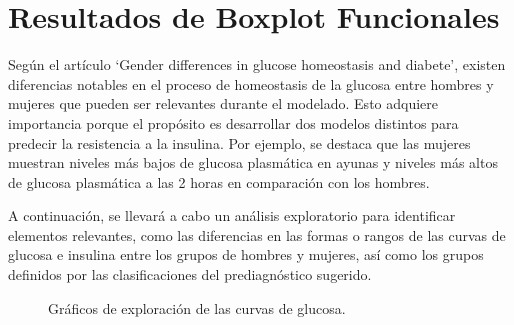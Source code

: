 \section{Resultados de Boxplot Funcionales}

Según el artículo `Gender differences in glucose homeostasis and diabete'\cite{GenderDifferences2018}, existen diferencias notables en el proceso de homeostasis de la glucosa entre hombres y mujeres que pueden ser relevantes durante el modelado. Esto adquiere importancia porque el propósito es desarrollar dos modelos distintos para predecir la resistencia a la insulina. Por ejemplo, se destaca que las mujeres muestran niveles más bajos de glucosa plasmática en ayunas y niveles más altos de glucosa plasmática a las 2 horas en comparación con los hombres.

A continuación, se llevará a cabo un análisis exploratorio para identificar elementos relevantes, como las diferencias en las formas o rangos de las curvas de glucosa e insulina entre los grupos de hombres y mujeres, así como los grupos definidos por las clasificaciones del prediagnóstico sugerido.



\begin{figure}[H]
 \centering
    \caption{Gráficos de exploración de las curvas de glucosa.}
    \label{fig:glucosa}
\end{figure}


